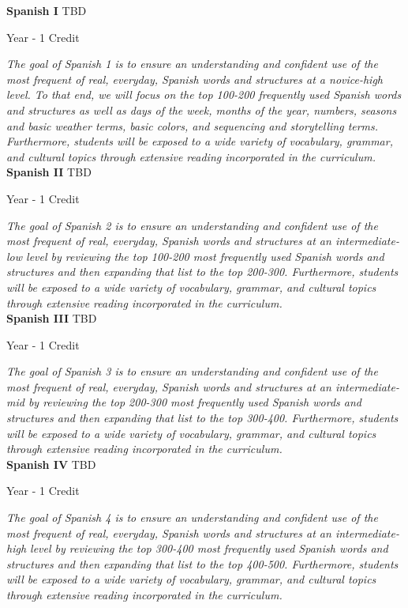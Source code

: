 \noindent\textbf{Spanish I} \hfill TBD

\noindent Year - 1 Credit

\vspace{1mm}\emph{The goal of Spanish 1 is to ensure an understanding and confident use of the most frequent of real, everyday, Spanish words and structures at a novice-high level.  To that end, we will focus on the top 100-200 frequently used Spanish words and structures as well as days of the week, months of the year, numbers, seasons and basic weather terms, basic colors, and sequencing and storytelling terms.  Furthermore, students will be exposed to a wide variety of vocabulary, grammar, and cultural topics through extensive reading incorporated in the curriculum.}\\

\noindent\textbf{Spanish II} \hfill TBD

\noindent Year - 1 Credit

\vspace{1mm}\emph{The goal of Spanish 2 is to ensure an understanding and confident use of the most frequent of real, everyday, Spanish words and structures at an intermediate-low level by reviewing the top 100-200 most frequently used Spanish words and structures and then expanding that list to the top 200-300.  Furthermore, students will be exposed to a wide variety of vocabulary, grammar, and cultural topics through extensive reading incorporated in the curriculum.}\\

\noindent\textbf{Spanish III} \hfill TBD

\noindent Year - 1 Credit

\vspace{1mm}\emph{The goal of Spanish 3 is to ensure an understanding and confident use of the most frequent of real, everyday, Spanish words and structures at an intermediate-mid by reviewing the top 200-300 most frequently used Spanish words and structures and then expanding that list to the top 300-400.  Furthermore, students will be exposed to a wide variety of vocabulary, grammar, and cultural topics through extensive reading incorporated in the curriculum.}\\

\noindent\textbf{Spanish IV} \hfill TBD

\noindent Year - 1 Credit

\vspace{1mm}\emph{The goal of Spanish 4 is to ensure an understanding and confident use of the most frequent of real, everyday, Spanish words and structures at an intermediate-high level by reviewing the top 300-400 most frequently used Spanish words and structures and then expanding that list to the top 400-500.  Furthermore, students will be exposed to a wide variety of vocabulary, grammar, and cultural topics through extensive reading incorporated in the curriculum.}\\

